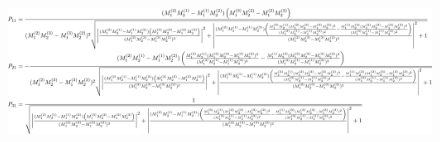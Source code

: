 \documentclass[
  a4paper,uplatex,dvipdfmx,9pt,
  xcolor = {dvipsnames,svgnames},
  hyperref ={colorlinks=true,citecolor=Navy,linkcolor=NavyBlue,urlcolor=purple}
]{beamer}
\begin{document}
\begin{frame}[plain]
  \frametitle{\thesubsection\ \subsecname}

  \begin{figure}[ht]    
    \centering
    \includegraphics[keepaspectratio,width=1.0\linewidth]{fig/diagonalize_matrix.png}    
  \end{figure}


\end{frame}
\end{document}
